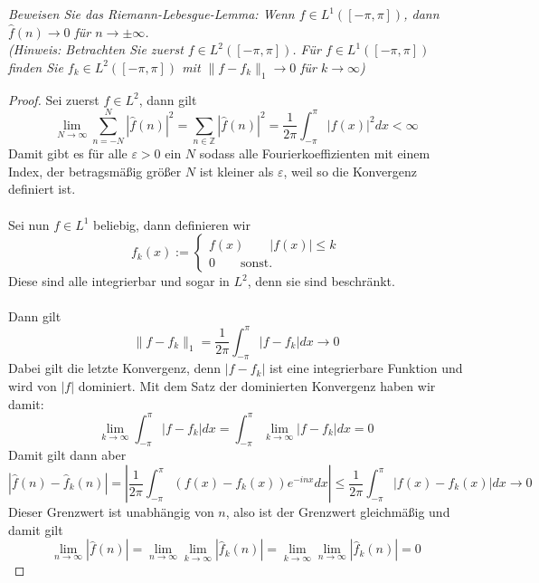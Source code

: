 \documentclass[11pt]{article}
\newcommand{\Z}{\mathbb{Z}}
\newenvironment{problem}[2][Beispiel]{
    \begin{trivlist}
        \item[\hskip \labelsep {\bfseries #1}\hskip \labelsep {\bfseries #2.}] \itshape}{
    \end{trivlist}\normalshape
}
\begin{document}
    \begin{problem}{4}
        Beweisen Sie das Riemann-Lebesgue-Lemma: Wenn $f\in L^1([-\pi,\pi])$, dann $\hat{f}(n)\to 0$ für
        $n\to\pm\infty$. \\
        (Hinweis: Betrachten Sie zuerst $f\in L^2([-\pi,\pi])$. Für $f\in L^1([-\pi,\pi])$ finden Sie
        $f_k\in L^2([-\pi,\pi])$ mit $\|f-f_k\|_1\to 0$ für $k\to\infty$)
    \end{problem}

    \begin{proof}
        Sei zuerst $f\in L^2$, dann gilt
        $$\lim_{N\to\infty}\sum_{n=-N}^{N}|\hat{f}(n)|^2=\sum_{n\in\Z}|\hat{f}(n)|^2 = \frac{1}{2\pi}
        \int_{-\pi}^{\pi}|f(x)|^2dx<\infty$$
        Damit gibt es für alle $\varepsilon>0$ ein $N$ sodass alle Fourierkoeffizienten mit einem Index, der
        betragsmäßig größer $N$ ist kleiner als $\varepsilon$, weil so die Konvergenz definiert ist. \\\\
        Sei nun $f\in L^1$ beliebig, dann definieren wir
        $$f_k(x):=
        \begin{cases}
            f(x) \qquad |f(x)|\leq k\\
            0 \qquad \text{sonst.}
        \end{cases}$$
        Diese sind alle integrierbar und sogar in $L^2$, denn sie sind beschränkt. \\\\
        Dann gilt
        $$\|f-f_k\|_1=\frac{1}{2\pi}\int_{-\pi}^\pi|f-f_k|dx\to 0$$
        Dabei gilt die letzte Konvergenz, denn $|f-f_k|$ ist eine integrierbare Funktion und wird von
        $|f|$ dominiert. Mit dem Satz der dominierten Konvergenz haben wir damit:
        $$\lim_{k\to\infty}\int_{-\pi}^\pi|f-f_k|dx=\int_{-\pi}^\pi\lim_{k\to\infty}|f-f_k|dx=0$$
        Damit gilt dann aber
        $$|\hat{f}(n)-\hat{f}_k(n)|= \left|\frac{1}{2\pi}\int_{-\pi}^{\pi} ({f}(x)-{f}_k(x))
        e^{-inx}dx\right|\leq \frac{1}{2\pi}\int_{-\pi}^{\pi} |{f}(x)-{f}_k(x)|dx\to 0$$
        Dieser Grenzwert ist unabhängig von $n$, also ist der Grenzwert gleichmäßig und damit
        gilt
        $$\lim_{n\to\infty}|\hat{f}(n)| = \lim_{n\to\infty}\lim_{k\to\infty}|\hat{f}_k(n)|=
        \lim_{k\to\infty}\lim_{n\to\infty}|\hat{f}_k(n)|=0$$
    \end{proof}
\end{document}
